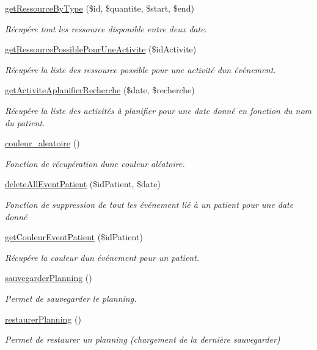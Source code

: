 \begin{DoxyCompactItemize}
\hyperlink{class_m___planning_a9a4a5513520eb81c0d68eebea2efcbe1}{get\+Ressource\+By\+Type} (\$id, \$quantite, \$start, \$end)
\begin{DoxyCompactList}\small\item\em Récupére tout les ressource disponible entre deux date. \end{DoxyCompactList}\item 
\hyperlink{class_m___planning_a4ae35a403f5ccd0e6cc0bbaa63ba0a61}{get\+Ressource\+Possible\+Pour\+Une\+Activite} (\$id\+Activite)
\begin{DoxyCompactList}\small\item\em Récupére la liste des ressource possible pour une activité d\textquotesingle{}un événement. \end{DoxyCompactList}\item 
\hyperlink{class_m___planning_aaa5c4efca4bf8509b7e8eae4076ba246}{get\+Activite\+Aplanifier\+Recherche} (\$date, \$recherche)
\begin{DoxyCompactList}\small\item\em Récupére la liste des activités à planifier pour une date donné en fonction du nom du patient. \end{DoxyCompactList}\item 
\hyperlink{class_m___planning_a63ae0c258ad2fb178f4b3c75a10eb347}{couleur\+\_\+aleatoire} ()
\begin{DoxyCompactList}\small\item\em Fonction de récupération d\textquotesingle{}une couleur aléatoire. \end{DoxyCompactList}\item 
\hyperlink{class_m___planning_af767bc59ccb16aa1c48e09a49a022bd6}{delete\+All\+Event\+Patient} (\$id\+Patient, \$date)
\begin{DoxyCompactList}\small\item\em Fonction de suppression de tout les événement lié à un patient pour une date donné \end{DoxyCompactList}\item 
\hyperlink{class_m___planning_a0aac198824080f06e0b99c83c93536fa}{get\+Couleur\+Event\+Patient} (\$id\+Patient)
\begin{DoxyCompactList}\small\item\em Récupére la couleur d\textquotesingle{}un événement pour un patient. \end{DoxyCompactList}\item 
\hyperlink{class_m___planning_af6dd0d894ed8b352cd3c5dba0542d645}{sauvegarder\+Planning} ()
\begin{DoxyCompactList}\small\item\em Permet de sauvegarder le planning. \end{DoxyCompactList}\item 
\hyperlink{class_m___planning_a369517047c830bb2298e908b6d296240}{restaurer\+Planning} ()
\begin{DoxyCompactList}\small\item\em Permet de restaurer un planning (chargement de la dernière sauvegarder) \end{DoxyCompactList}\end{DoxyCompactItemize}



